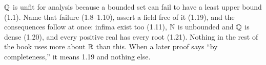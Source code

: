 \documentclass[11pt,twoside]{article}
\begin{document}
\begin{recap}
$\mathbb{Q}$ is unfit for analysis because a bounded set can fail to have a least upper
bound (1.1). Name that failure (1.8--1.10), assert a field free of it (1.19),
and the consequences follow at once: infima exist too (1.11), $\mathbb{N}$ is unbounded
and $\mathbb{Q}$ is dense (1.20), and every positive real has every root (1.21). Nothing
in the rest of the book uses more about $\mathbb{R}$ than this. When a later proof says
``by completeness,'' it means 1.19 and nothing else.
\end{recap}
\end{document}
